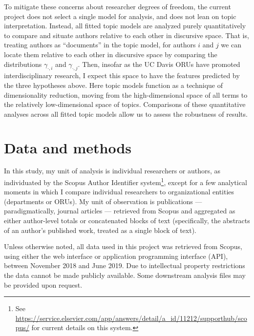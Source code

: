 \documentclass[
  11pt,
]{article}
\begin{document}
To mitigate these concerns about researcher degrees of freedom, the current project does not select a single model for analysis, and does not lean on topic interpretation. Instead, all fitted topic models are analyzed purely quantitatively to compare and situate authors relative to each other in discursive space. That is, treating authors as ``documents'' in the topic model, for authors \(i\) and \(j\) we can locate them relative to each other in discursive space by comparing the distributions \(\gamma_{\cdot,i}\) and \(\gamma_{\cdot,j}\). Then, insofar as the UC Davis ORUs have promoted interdisciplinary research, I expect this space to have the features predicted by the three hypotheses above. Here topic models function as a technique of dimensionality reduction, moving from the high-dimensional space of all terms to the relatively low-dimensional space of topics. Comparisons of these quantitative analyses across all fitted topic models allow us to assess the robustness of results.

\hypertarget{data-and-methods}{%
\section{Data and methods}\label{data-and-methods}}

In this study, my unit of analysis is individual researchers or authors, as individuated by the Scopus Author Identifier system\footnote{See \url{https://service.elsevier.com/app/answers/detail/a_id/11212/supporthub/scopus/} for current details on this system.}, except for a few analytical moments in which I compare individual researchers to organizational entities (departments or ORUs). My unit of observation is publications --- paradigmatically, journal articles --- retrieved from Scopus and aggregated as either author-level totals or concatenated blocks of text (specifically, the abstracts of an author's published work, treated as a single block of text).

Unless otherwise noted, all data used in this project was retrieved from Scopus, using either the web interface or application programming interface (API), between November 2018 and June 2019. Due to intellectual property restrictions the data cannot be made publicly available. Some downstream analysis files may be provided upon request.
\end{document}
